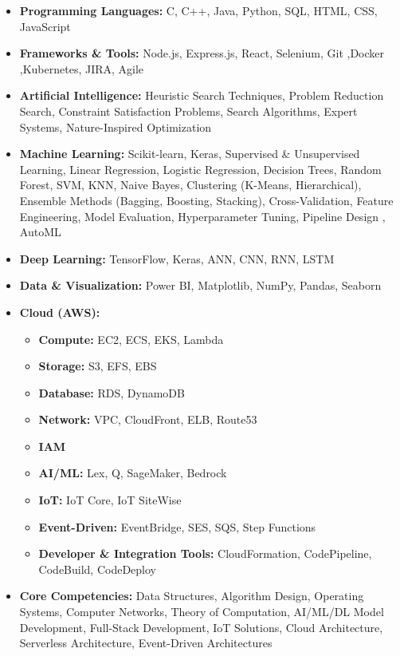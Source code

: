 \documentclass[10pt,a4paper]{article}
\begin{document}
\begin{itemize}

    \item \textbf{Programming Languages:} C, C++, Java, Python, SQL, HTML, CSS, JavaScript
    \item \textbf{Frameworks \& Tools:} Node.js, Express.js, React, Selenium, Git ,Docker ,Kubernetes, JIRA, Agile
    \item \textbf{Artificial Intelligence:} Heuristic Search Techniques, Problem Reduction Search, Constraint Satisfaction Problems, Search Algorithms, Expert Systems, Nature-Inspired Optimization
    \item \textbf{Machine Learning:} Scikit-learn, Keras, Supervised & Unsupervised Learning, Linear Regression, Logistic Regression, Decision Trees, Random Forest, SVM, KNN, Naive Bayes, Clustering (K-Means, Hierarchical), Ensemble Methods (Bagging, Boosting, Stacking), Cross-Validation, Feature Engineering, Model Evaluation, Hyperparameter Tuning, Pipeline Design , AutoML
    \item \textbf{Deep Learning:} TensorFlow, Keras, ANN, CNN, RNN, LSTM

    \item \textbf{Data \& Visualization:} Power BI, Matplotlib, NumPy, Pandas, Seaborn
    \item \textbf{Cloud (AWS):} 
    \begin{itemize}
        \item \textbf{Compute:} EC2, ECS, EKS, Lambda
        \item \textbf{Storage:} S3, EFS, EBS
        \item \textbf{Database:} RDS, DynamoDB
        \item \textbf{Network:} VPC, CloudFront, ELB, Route53
        \item \textbf{IAM}
        \item \textbf{AI/ML:} Lex, Q, SageMaker, Bedrock
        \item \textbf{IoT:} IoT Core, IoT SiteWise
        \item \textbf{Event-Driven:} EventBridge, SES, SQS, Step Functions
        \item \textbf{Developer \& Integration Tools:} CloudFormation, CodePipeline, CodeBuild, CodeDeploy
    \end{itemize}

    \item \textbf{Core Competencies:} Data Structures, Algorithm Design, Operating Systems, Computer Networks, Theory of Computation, AI/ML/DL Model Development, Full-Stack Development, IoT Solutions, Cloud Architecture, Serverless Architecture, Event-Driven Architectures

\end{itemize}
\end{document}
